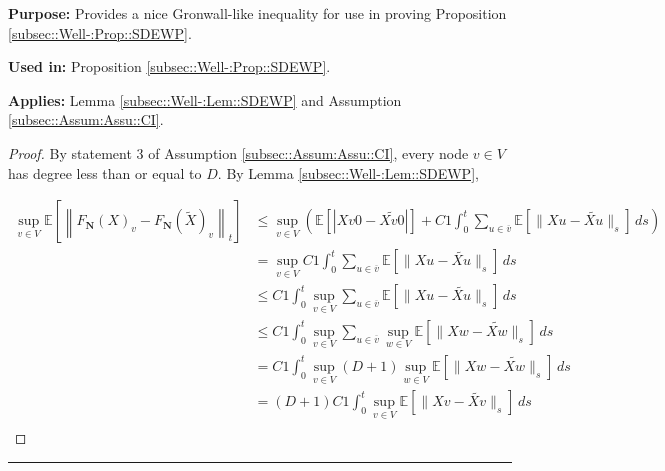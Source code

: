 \documentclass[12pt]{article}
\newcommand{\mb}{\mathbb}
\newcommand{\ov}{\overline}
\newcommand{\purpose}{\textbf{Purpose: }}
\newcommand{\usein}{\textbf{Used in: }}
\newcommand{\app}{\textbf{Applies: }}
\newcommand{\lin}{\rule{\linewidth}{0.4 pt}}
\newcommand{\ex}[1]{\mb{E}\left[#1\right]}			%
\renewcommand{\v}{v}							%
\newcommand{\vv}{u}								%
\newcommand{\vvv}{w}							%
\renewcommand{\t}{t}							%
\renewcommand{\tt}{s}							%
\newcommand{\X}{X}								%
\newcommand{\cl}{\ov}							%
\newcommand{\const}{C}							%
\newcommand{\degr}{D}							%
\newcommand{\poisses}{\mathbf{N}}				%
\newcommand{\alt}{\widetilde}						%
\begin{document}
\purpose Provides a nice Gronwall-like inequality for use in proving Proposition \ref{subsec::Well-:Prop::SDEWP}.

\usein Proposition \ref{subsec::Well-:Prop::SDEWP}.

\app Lemma \ref{subsec::Well-:Lem::SDEWP} and Assumption \ref{subsec::Assum:Assu::CI}.

\begin{proof}
By statement 3 of Assumption \ref{subsec::Assum:Assu::CI}, every node \(v \in V\) has degree less than or equal to \(\degr\). By Lemma \ref{subsec::Well-:Lem::SDEWP},

\begin{align*}
\sup_{\v \in  V} \ex{\left\|F_\poisses(\X{}{})_\v - F_\poisses(\alt{\X{}{}})_\v\right\|_\t} &\leq \sup_{\v\in  V}\left(\ex{|\X{\v}{0} - \alt{\X{\v}{0}}|} +  \const{1}\int_0^\t \sum_{\vv\in \cl{\v}} \ex{\|\X{\vv} - \alt{\X{\vv}{}}\|_\tt}\,d\tt\right)\\
&=\sup_{\v \in  V} \const{1}\int_0^\t \sum_{\vv \in \cl{\v}} \ex{\|\X{\vv} - \alt{\X{\vv}{}}\|_\tt}\,d\tt\\
&\leq \const{1}\int_0^\t \sup_{\v \in  V}\sum_{\vv \in \cl{\v}} \ex{\|\X{\vv} - \alt{\X{\vv}{}}\|_\tt}\,d\tt\\
&\leq \const{1}\int_0^\t \sup_{\v \in  V}\sum_{\vv \in \cl{\v}}\sup_{\vvv\in V} \ex{\|\X{\vvv} - \alt{\X{\vvv}{}}\|_\tt}\,d\tt\\
&= \const{1}\int_0^\t \sup_{\v \in  V}(\degr+1)\sup_{\vvv\in V} \ex{\|\X{\vvv} - \alt{\X{\vvv}{}}\|_\tt}\,d\tt\\
&= (\degr+1)\const{1}\int_0^\t \sup_{\v\in V} \ex{\|\X{\v} - \alt{\X{\v}{}}\|_\tt}\,d\tt\\
\end{align*}
\end{proof}
\lin
\end{document}
